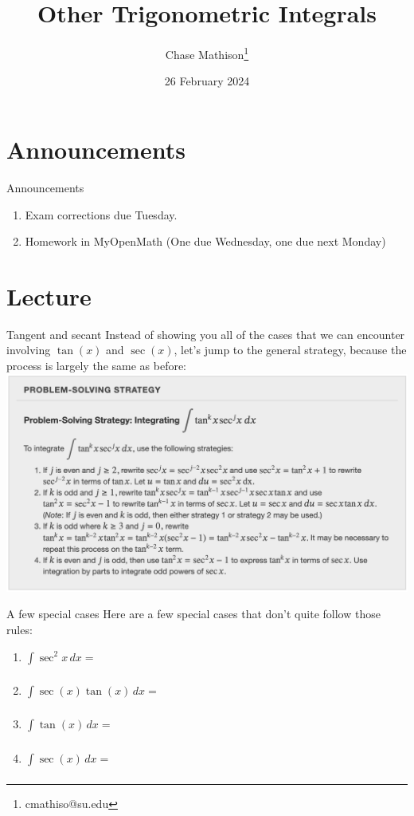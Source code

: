 \documentclass[presentation]{beamer}
\institute[SU]{Shenandoah University}
\author{Chase Mathison\thanks{cmathiso@su.edu}}
\date{26 February 2024}
\title{Other Trigonometric Integrals}
\begin{document}
\maketitle

\section{Announcements}
\label{sec:orgcda46e5}
\begin{frame}[label={sec:orge9acb5b}]{Announcements}
\begin{enumerate}
\item Exam corrections due Tuesday.
\item Homework in MyOpenMath (One due Wednesday, one due next Monday)
\end{enumerate}
\end{frame}

\section{Lecture}
\label{sec:orga2c53e4}
\begin{frame}[label={sec:org76c169d}]{Tangent and secant}
Instead of showing you all of the cases that we can encounter
involving \(\tan(x)\) and \(\sec(x)\), let's jump to the general
strategy, because the process is largely the same as before:
\includegraphics[width=\textwidth]{../img/day018-03.png}
\end{frame}

\begin{frame}[label={sec:org13c4a91}]{A few special cases}
Here are a few special cases that don't quite follow those rules:
\begin{enumerate}
\item \(\int\limits_{}^{} \sec^2 x\,dx =\)
\item \(\int\limits_{}^{} \sec(x)\tan(x)\,dx =\)
\item \(\int\limits_{}^{} \tan(x)\,dx =\)
\item \(\int\limits_{}^{} \sec(x)\,dx =\)
\end{enumerate}
\end{frame}
\end{document}

